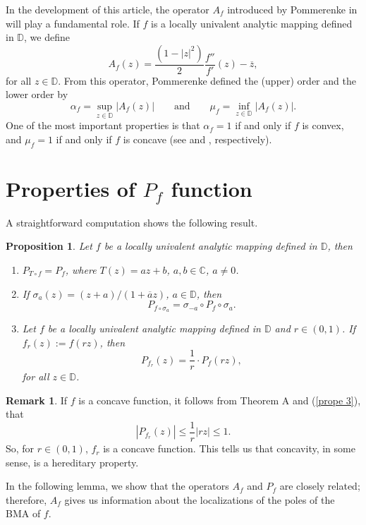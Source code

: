 \documentclass[reqno]{amsart}
\theoremstyle{plain}
\newtheorem{prop}[theo]{Proposition}
\theoremstyle{definition}
\newtheorem{rem}[theo]{Remark}
\newcommand{\C}{\mathbb{C}}
\newcommand{\D}{\mathbb{D}}
\begin{document}
In the development of this article, the operator $A_f$ introduced by Pommerenke in \cite{Pomm1964} will play a fundamental role. If $f$ is a locally univalent analytic mapping defined in $\D$, we define
\[A_f(z)=\frac{(1-|z|^2)}{2}\frac{f''}{f'}(z)-\overline{z},\] for all $z\in \D$. From this operator, Pommerenke defined the (upper) order \cite{Pomm1964} and the lower order \cite{Pomm2007} by
\[\alpha_f=\sup_{z\in \mathbb{D}}|A_f(z)| \qquad \text{and} \qquad \mu_f=\inf_{z\in \mathbb{D}}|A_f(z)|.\]
One of the most important properties is that $\alpha_f=1$ if and only if $f$ is convex, and $\mu_f=1$ if and only if $f$ is concave (see \cite{Pomm1964} and \cite{Pomm2007}, respectively).


\section{Properties of $P_f$ function}
A straightforward computation shows the following result.
\begin{prop} \label{Propie}
Let $f$ be a locally univalent analytic mapping defined in $\D$, then
\begin{enumerate}[wide]
    \item [$(i)$] $P_{T \circ f}=P_f$, where $T(z)=az+b$, $a,b\in \C$, $a\neq 0$.
    \item [$(ii)$] If $\sigma_a(z)=(z+a)/(1+\overline{a}z)$, $a\in \D$, then
    \begin{equation}\label{prope 2}
     P_{f\circ \sigma_a}=\sigma_{-a}\circ P_f \circ \sigma_a.   
    \end{equation}
    \item [$(iii)$] Let $f$ be a locally univalent analytic mapping defined in $\D$ and $r\in (0,1)$. If $f_r(z):=f(rz)$, then 
    \begin{equation} \label{prope 3}
       P_{f_r}(z)=\frac1r\cdot P_f(rz), 
    \end{equation}
      for all $z\in \D$.
\end{enumerate}
\end{prop}

\begin{rem}
   If $f$ is a concave function, it follows from Theorem A and (\ref{prope 3}), that \[|P_{f_r}(z)|\leq \frac{1}{r}|rz|\leq 1.\]
   So, for $r\in (0,1)$, $f_r$ is a concave function. This tells us that concavity, in some sense, is a hereditary property. 
\end{rem}

In the following lemma, we show that the operators $A_f$ and $P_f$ are closely related; therefore, $A_f$ gives us information about the localizations of the poles of the BMA of $f$.
\end{document}
